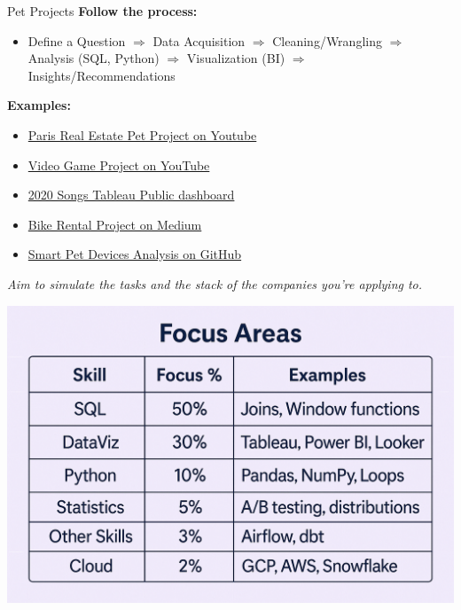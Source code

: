 \documentclass[10pt,a4paper]{article}
\begin{document}
\begin{multicols}{3}
\begin{textboxRed}{Pet Projects}
\textbf{Follow the process:}
\begin{itemize}
    \item Define a Question $\Rightarrow$ Data Acquisition $\Rightarrow$ Cleaning/Wrangling $\Rightarrow$ Analysis (SQL, Python) $\Rightarrow$ Visualization (BI) $\Rightarrow$ Insights/Recommendations
\end{itemize}
\textbf{Examples:}
\begin{itemize}
    \item \href{https://youtube.com/watch?v=HKuhMtrEgDE}{Paris Real Estate Pet Project on Youtube}
    \item \href{https://youtube.com/watch?v=HKuhMtrEgDE}{Video Game Project on YouTube} 
    \item \href{https://public.tableau.com/app/profile/ryansoares/viz/GoogleSearchTrendsMostSuccessfulSongsof2020/Dashboard}{2020 Songs Tableau Public dashboard} 
    \item \href{https://medium.com/@joseikwame/cyclistic-bike-share-analysis-case-study-99095c444505}{Bike Rental Project on Medium} 
    \item \href{https://github.com/amritachinnam/Customer-Data-Analytics-Power-BI}{Smart Pet Devices Analysis on GitHub}
\end{itemize}

\textit{Aim to simulate the tasks and the stack of the companies you’re applying to.}

\end{textboxRed}

\begin{textboxWhite}{}
	\includegraphics[width=\textwidth]{table.png}
\end{textboxWhite}


\end{multicols}
\end{document}
